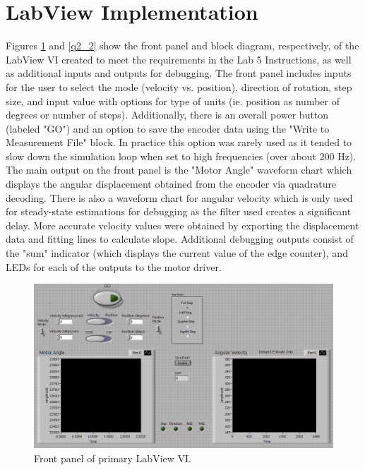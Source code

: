 \documentclass{article}
\theoremstyle{plain}
\theoremstyle{definition}
\theoremstyle{remark}
\begin{document}
\section{LabView Implementation}
Figures \ref{q2_1} and \ref{q2_2} show the front panel and block diagram, respectively, of the LabView VI created to meet the requirements in the Lab 5 Instructions, as well as additional inputs and outputs for debugging. The front panel includes inputs for the user to select the mode (velocity vs. position), direction of rotation, step size, and input value with options for type of units (ie. position as number of degrees or number of steps). Additionally, there is an overall power button (labeled "GO") and an option to save the encoder data using the "Write to Measurement File" block. In practice this option was rarely used as it tended to slow down the simulation loop when set to high frequencies (over about 200 Hz).\\

The main output on the front panel is the "Motor Angle" waveform chart which displays the angular displacement obtained from the encoder via quadrature decoding. There is also a waveform chart for angular velocity which is only used for steady-state estimations for debugging as the filter used creates a significant delay. More accurate velocity values were obtained by exporting the displacement data and fitting lines to calculate slope. Additional debugging outputs consist of the "sum" indicator (which displays the current value of the edge counter), and LEDs for each of the outputs to the motor driver.     \\


\begin{figure}[hbt]
\begin{center}
\includegraphics[width = 18cm]{VIFrontPanel.png}
\caption{Front panel of primary LabView VI.}
\label{q2_1}
\end{center}
\end{figure}
\end{document}
